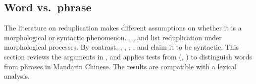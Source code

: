 



\subsection{Word vs.\ phrase}\label{sec:word}

The literature on reduplication makes different assumptions on whether it is a morphological or syntactic phenomenon.
\citet[Ch. 4]{Chao1968}, \citet[Ch. 3]{LiThompson1981}, \citet[Sec.\,4.1]{Dai1992} and \citet[4--5]{Liao2014} list reduplication under morphological processes. 
By contrast, \citet[23]{Arcodiaetal2014}, \citet{Xiong2016}, \citet[146]{BascianoMelloni2017}, \citet[229--231]{YangWei2017}, \citet[330]{MelloniBasciano2018} and \citet{Xie2020}  claim it to be syntactic.
This section reviews the arguments in \citet{Xie2020},
and applies tests from \citeauthor{Dai1992} (\citeyear[Sec.\,7]{Dai1992}, \citeyear[Sec.\,2.3--2.4]{Dai1998}) to distinguish words from phrases in Mandarin Chinese.
The results are compatible with a lexical analysis.



